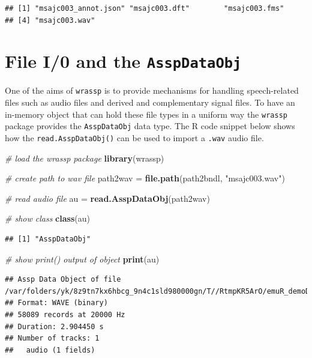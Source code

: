 \documentclass[]{book}
\newenvironment{Shaded}{\begin{snugshade}}{\end{snugshade}}
\newcommand{\CommentTok}[1]{\textcolor[rgb]{0.56,0.35,0.01}{\textit{#1}}}
\newcommand{\KeywordTok}[1]{\textcolor[rgb]{0.13,0.29,0.53}{\textbf{#1}}}
\newcommand{\NormalTok}[1]{#1}
\newcommand{\StringTok}[1]{\textcolor[rgb]{0.31,0.60,0.02}{#1}}
\begin{document}
\begin{verbatim}
## [1] "msajc003_annot.json" "msajc003.dft"        "msajc003.fms"       
## [4] "msajc003.wav"
\end{verbatim}

\hypertarget{file-i0-and-the-asspdataobj}{%
\section{\texorpdfstring{File I/0 and the \texttt{AsspDataObj}}{File I/0 and the AsspDataObj}}\label{file-i0-and-the-asspdataobj}}

One of the aims of \texttt{wrassp} is to provide mechanisms for handling speech-related files such as audio files and derived and complementary signal files. To have an in-memory object that can hold these file types in a uniform way the \texttt{wrassp} package provides the \texttt{AsspDataObj} data type. The R code snippet below shows how the \texttt{read.AsspDataObj()} can be used to import a \texttt{.wav} audio file.

\begin{Shaded}
\begin{Highlighting}[]
\CommentTok{# load the wrassp package}
\KeywordTok{library}\NormalTok{(wrassp)}

\CommentTok{# create path to wav file}
\NormalTok{path2wav =}\StringTok{ }\KeywordTok{file.path}\NormalTok{(path2bndl, }\StringTok{"msajc003.wav"}\NormalTok{)}

\CommentTok{# read audio file}
\NormalTok{au =}\StringTok{ }\KeywordTok{read.AsspDataObj}\NormalTok{(path2wav)}

\CommentTok{# show class}
\KeywordTok{class}\NormalTok{(au)}
\end{Highlighting}
\end{Shaded}

\begin{verbatim}
## [1] "AsspDataObj"
\end{verbatim}

\begin{Shaded}
\begin{Highlighting}[]
\CommentTok{# show print() output of object}
\KeywordTok{print}\NormalTok{(au)}
\end{Highlighting}
\end{Shaded}

\begin{verbatim}
## Assp Data Object of file /var/folders/yk/8z9tn7kx6hbcg_9n4c1sld980000gn/T//RtmpKR5ArO/emuR_demoData/ae_emuDB/0000_ses/msajc003_bndl/msajc003.wav.
## Format: WAVE (binary)
## 58089 records at 20000 Hz
## Duration: 2.904450 s
## Number of tracks: 1 
##   audio (1 fields)
\end{verbatim}
\end{document}
